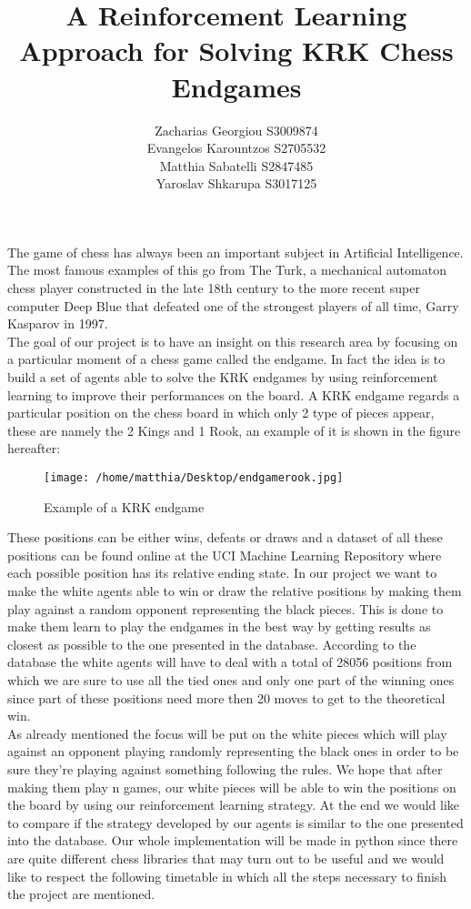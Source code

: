 \documentclass[a4paper,hidelinks]{article}
\author{Zacharias Georgiou S3009874\\ Evangelos Karountzos S2705532\\ Matthia Sabatelli S2847485\\ Yaroslav Shkarupa S3017125}
\title{A Reinforcement Learning Approach for Solving KRK Chess Endgames}
\begin{document}
\maketitle

The game of chess has always been an important subject in Artificial Intelligence. The most famous examples of this go from The Turk, a mechanical automaton chess player constructed in the late 18th century to the more recent super computer Deep Blue that defeated one of the strongest players of all time, Garry Kasparov in 1997.\\
The goal of our project is to have an insight on this research area by focusing on a particular moment of a chess game called the endgame. In fact the idea is to build a set of agents able to solve the KRK endgames by using reinforcement learning to improve their performances on the board. A KRK endgame regards a particular position on the chess board in which only 2 type of pieces appear, these are namely the 2 Kings and 1 Rook, an example of it is shown in the figure hereafter:

\begin{figure}[ht!]
\centering
\texttt{[image: /home/matthia/Desktop/endgamerook.jpg]}
\caption{Example of a KRK endgame \label{overflow}}
\end{figure}

These positions can be either wins, defeats or draws and a dataset of all these positions can be found online at the UCI Machine Learning Repository where each possible position has its relative ending state. In our project we want to make the white agents able to win or draw the relative positions by making them play against a random opponent representing the black pieces. This is done to make them learn to play the endgames in the best way by getting results as closest as possible to the one presented in the database. According to the database the white agents will have to deal with a total of 28056 positions from which we are sure to use all the tied ones and only one part of the winning ones since part of these positions need more then 20 moves to get to the theoretical win.\\ As already mentioned the focus will be put on the white pieces which will play against an opponent playing randomly representing the black ones in order to be sure they're playing against something following the rules. We hope that after making them play n games, our white pieces will be able to win the positions on the board by using our reinforcement learning strategy. At the end we would like to compare if the strategy developed by our agents is similar to the one presented into the database. Our whole implementation will be made in python since there are quite different chess libraries that may turn out to be useful and we would like to respect the following timetable in which all the steps necessary to finish the project are mentioned.
\end{document}
